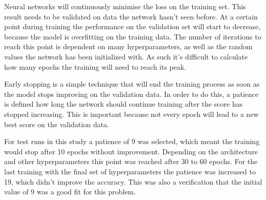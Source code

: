 Neural networks will continuously minimise the loss on the training set. This result needs to be validated on data the network hasn't seen before. At a certain point during training the performance on the validation set will start to decrease, because the model is overfitting on the training data. The number of iterations to reach this point is dependent on many hyperparameters, as well as the random values the network has been initialized with. As such it's difficult to calculate how many epochs the training will need to reach its peak.

Early stopping is a simple technique that will end the training process as soon as the model stops improving on the validation data. In order to do this, a patience is defined how long the network should continue training after the score has stopped increasing. This is important because not every epoch will lead to a new best score on the validation data.

For test runs in this study a patience of 9 was selected, which meant the training would stop after 10 epochs without improvement. Depending on the architecture and other hyperparameters this point was reached after 30 to 60 epochs. For the last training with the final set of hyperparameters the patience was increased to 19, which didn't improve the accuracy.  This was also a verification that the initial value of 9 was a good fit for this problem.



\newpage
